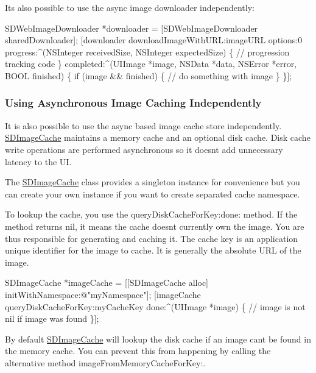 It\textquotesingle{}s also possible to use the async image downloader independently\+:


\begin{DoxyCode}
SDWebImageDownloader *downloader = [SDWebImageDownloader sharedDownloader];
[downloader downloadImageWithURL:imageURL
                         options:0
                        progress:^(NSInteger receivedSize, NSInteger expectedSize) \{
                            // progression tracking code
                        \}
                       completed:^(UIImage *image, NSData *data, NSError *error, BOOL finished) \{
                            if (image && finished) \{
                                // do something with image
                            \}
                        \}];
\end{DoxyCode}


\subsubsection*{Using Asynchronous Image Caching Independently}

It is also possible to use the async based image cache store independently. \mbox{\hyperlink{interface_s_d_image_cache}{S\+D\+Image\+Cache}} maintains a memory cache and an optional disk cache. Disk cache write operations are performed asynchronous so it doesn\textquotesingle{}t add unnecessary latency to the UI.

The \mbox{\hyperlink{interface_s_d_image_cache}{S\+D\+Image\+Cache}} class provides a singleton instance for convenience but you can create your own instance if you want to create separated cache namespace.

To lookup the cache, you use the {\ttfamily query\+Disk\+Cache\+For\+Key\+:done\+:} method. If the method returns nil, it means the cache doesn\textquotesingle{}t currently own the image. You are thus responsible for generating and caching it. The cache key is an application unique identifier for the image to cache. It is generally the absolute U\+RL of the image.


\begin{DoxyCode}
SDImageCache *imageCache = [[SDImageCache alloc] initWithNamespace:@"myNamespace"];
[imageCache queryDiskCacheForKey:myCacheKey done:^(UIImage *image) \{
    // image is not nil if image was found
\}];
\end{DoxyCode}


By default \mbox{\hyperlink{interface_s_d_image_cache}{S\+D\+Image\+Cache}} will lookup the disk cache if an image can\textquotesingle{}t be found in the memory cache. You can prevent this from happening by calling the alternative method {\ttfamily image\+From\+Memory\+Cache\+For\+Key\+:}.


